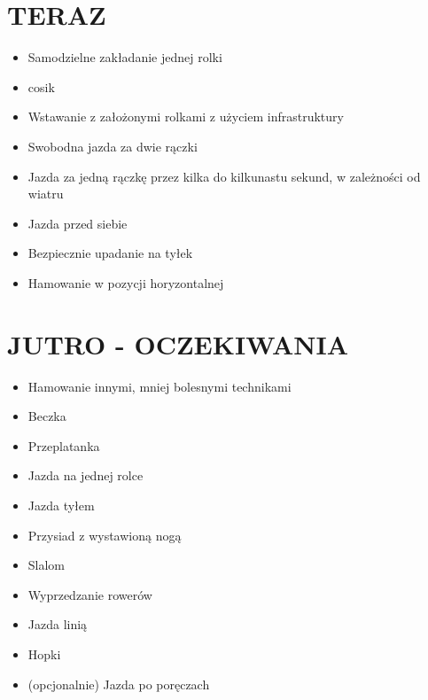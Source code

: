 \documentclass[12pt]{article}
\begin{document}
\section*{TERAZ}
\begin{itemize}
	\item Samodzielne zakładanie jednej rolki
	\item cosik
	\item Wstawanie z założonymi rolkami z użyciem infrastruktury
	\item Swobodna jazda za dwie rączki
	\item Jazda za jedną rączkę przez kilka do kilkunastu sekund, w zależności od wiatru
	\item Jazda przed siebie
	\item Bezpiecznie upadanie na tyłek
	\item Hamowanie w pozycji horyzontalnej
\end{itemize}

\section*{JUTRO - OCZEKIWANIA}
\begin{itemize}
	\item Hamowanie innymi, mniej bolesnymi technikami
	\item Beczka
	\item Przeplatanka
	\item Jazda na jednej rolce
	\item Jazda tyłem
	\item Przysiad z wystawioną nogą
	\item Slalom
	\item Wyprzedzanie rowerów
	\item Jazda linią
	\item Hopki
	\item (opcjonalnie) Jazda po poręczach
\end{itemize}
\end{document}
